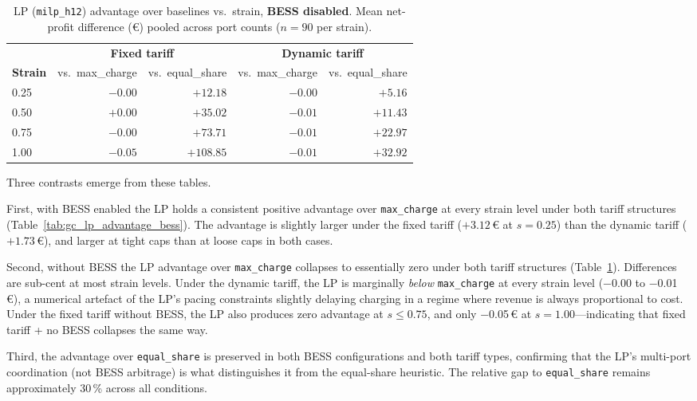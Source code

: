 \begin{table}[!htb]
\centering
\caption{LP (\texttt{milp\_h12}) advantage over baselines vs.\ strain,
         \textbf{BESS disabled}.  Mean net-profit difference (€) pooled
         across port counts ($n=90$ per strain).}
\label{tab:gc_lp_advantage_nobess}
\begin{tabular}{l rr rr}
\toprule
 & \multicolumn{2}{c}{\textbf{Fixed tariff}}
 & \multicolumn{2}{c}{\textbf{Dynamic tariff}} \\
\cmidrule(lr){2-3}\cmidrule(lr){4-5}
\textbf{Strain} & vs.\ max\_charge & vs.\ equal\_share
                & vs.\ max\_charge & vs.\ equal\_share \\
\midrule
0.25 & $-0.00$ & $+12.18$ & $-0.00$ & $+5.16$ \\
0.50 & $+0.00$ & $+35.02$ & $-0.01$ & $+11.43$ \\
0.75 & $-0.00$ & $+73.71$ & $-0.01$ & $+22.97$ \\
1.00 & $-0.05$ & $+108.85$ & $-0.01$ & $+32.92$ \\
\bottomrule
\end{tabular}
\end{table}

Three contrasts emerge from these tables.

First, with BESS enabled the LP holds a consistent positive advantage over
\texttt{max\_charge} at every strain level under both tariff structures
(Table~\ref{tab:gc_lp_advantage_bess}).  The advantage is slightly larger
under the fixed tariff ($+3.12$\,€ at $s=0.25$) than the dynamic tariff
($+1.73$\,€), and larger at tight caps than at loose caps in both cases.

Second, without BESS the LP advantage over \texttt{max\_charge} collapses to
essentially zero under both tariff structures
(Table~\ref{tab:gc_lp_advantage_nobess}).  Differences are sub-cent at most
strain levels.  Under the dynamic tariff, the LP is marginally \emph{below}
\texttt{max\_charge} at every strain level (−0.00 to −0.01\,€), a numerical
artefact of the LP's pacing constraints slightly delaying charging in a regime
where revenue is always proportional to cost.  Under the fixed tariff without
BESS, the LP also produces zero advantage at $s \leq 0.75$, and only −0.05\,€
at $s=1.00$—indicating that fixed tariff + no BESS collapses the same way.

Third, the advantage over \texttt{equal\_share} is preserved in both BESS
configurations and both tariff types, confirming that the LP's multi-port
coordination (not BESS arbitrage) is what distinguishes it from the
equal-share heuristic.  The relative gap to \texttt{equal\_share} remains
approximately 30\,\% across all conditions.

